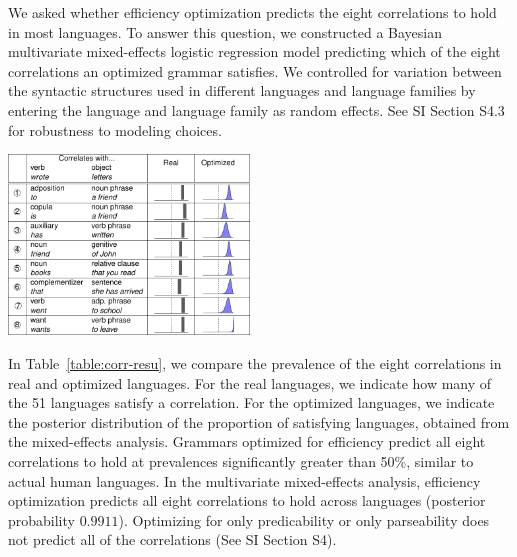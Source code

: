 \documentclass[9pt,twocolumn,twoside,lineno]{pnas-new}
\begin{document}
We asked whether efficiency optimization predicts the eight correlations to hold in most languages.
To answer this question, we constructed a Bayesian multivariate mixed-effects logistic regression model predicting which of the eight correlations an optimized grammar satisfies.
We controlled for variation between the syntactic structures used in different languages and language families by entering the language and language family as random effects.
See SI Section S4.3 for robustness to modeling choices.


\begin{table}
    \centering
    \includegraphics[width=0.48\textwidth]{table2.pdf}

\caption{Efficiency optimization accurately predicts the Greenbergian correlations.
For each correlation, we provide its prevalence (between 0\% and 100\%) among the actual grammars of the 51 languages (left), and the posterior distribution of the prevalence among grammars optimized for efficiency (right) on datasets from the 51 languages.
Efficiency optimization predicts all eight correlations to hold in the majority of grammars, matching the distribution observed in real languages. %
}\label{table:corr-resu}
\end{table}




In Table~\ref{table:corr-resu}, we compare the prevalence of the eight correlations in real and optimized languages.
For the real languages, we indicate how many of the 51 languages satisfy a correlation.
For the optimized languages, we indicate the posterior distribution of the proportion of satisfying languages, obtained from the mixed-effects analysis. %
Grammars optimized for efficiency predict all eight correlations to hold at prevalences significantly greater than 50\%, similar to actual human languages.
In the multivariate mixed-effects analysis, efficiency optimization predicts all eight correlations to hold across languages (posterior probability $0.9911$). 
Optimizing for only predicability or only parseability does not predict all of the correlations (See SI Section S4).
\end{document}
